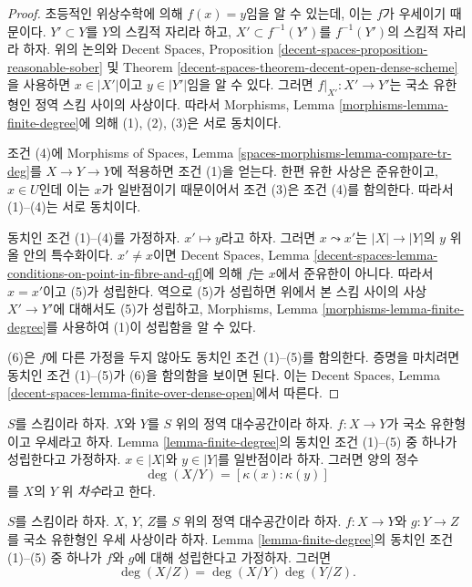 \begin{proof}
초등적인 위상수학에 의해 $f(x) = y$임을 알 수 있는데, 이는 $f$가
우세이기 때문이다. $Y' \subset Y$를 $Y$의 스킴적 자리라 하고,
$X' \subset f^{-1}(Y')$를 $f^{-1}(Y')$의 스킴적 자리라 하자. 위의
논의와 Decent Spaces, Proposition
\ref{decent-spaces-proposition-reasonable-sober} 및 Theorem
\ref{decent-spaces-theorem-decent-open-dense-scheme}을 사용하면
$x \in |X'|$이고 $y \in |Y'|$임을 알 수 있다. 그러면
$f|_{X'} : X' \to Y'$는 국소 유한형인 정역 스킴 사이의 사상이다.
따라서 Morphisms, Lemma \ref{morphisms-lemma-finite-degree}에 의해
(1), (2), (3)은 서로 동치이다.

\medskip\noindent
조건 (4)에 Morphisms of Spaces, Lemma
\ref{spaces-morphisms-lemma-compare-tr-deg}를 $X \to Y \to Y$에 적용하면
조건 (1)을 얻는다. 한편 유한 사상은 준유한이고, $x \in U$인데 이는
$x$가 일반점이기 때문이어서 조건 (3)은 조건 (4)를 함의한다. 따라서 (1)--(4)는
서로 동치이다.

\medskip\noindent
동치인 조건 (1)--(4)를 가정하자. $x' \mapsto y$라고 하자. 그러면
$x \leadsto x'$는 $|X| \to |Y|$의 $y$ 위 올 안의 특수화이다.
$x' \not = x$이면 Decent Spaces, Lemma
\ref{decent-spaces-lemma-conditions-on-point-in-fibre-and-qf}에 의해
$f$는 $x$에서 준유한이 아니다. 따라서 $x = x'$이고 (5)가 성립한다.
역으로 (5)가 성립하면 위에서 본 스킴 사이의 사상 $X' \to Y'$에
대해서도 (5)가 성립하고, Morphisms, Lemma
\ref{morphisms-lemma-finite-degree}를 사용하여 (1)이 성립함을 알 수 있다.

\medskip\noindent
(6)은 $f$에 다른 가정을 두지 않아도 동치인 조건 (1)--(5)를
함의한다. 증명을 마치려면 동치인 조건 (1)--(5)가 (6)을 함의함을
보이면 된다. 이는 Decent Spaces, Lemma
\ref{decent-spaces-lemma-finite-over-dense-open}에서 따른다.
\end{proof}

\begin{definition}
\label{definition-degree}
$S$를 스킴이라 하자. $X$와 $Y$를 $S$ 위의 정역 대수공간이라 하자.
$f : X \to Y$가 국소 유한형이고 우세라고 하자. Lemma
\ref{lemma-finite-degree}의 동치인 조건 (1)--(5) 중 하나가 성립한다고
가정하자. $x \in |X|$와 $y \in |Y|$를 일반점이라 하자. 그러면 양의
정수
$$
\deg(X/Y) = [\kappa(x) : \kappa(y)]
$$
를 $X$의 $Y$ 위 {\it 차수}라고 한다.
\end{definition}

\begin{lemma}
\label{lemma-degree-composition}
$S$를 스킴이라 하자. $X$, $Y$, $Z$를 $S$ 위의 정역 대수공간이라
하자. $f : X \to Y$와 $g : Y \to Z$를 국소 유한형인 우세 사상이라
하자. Lemma \ref{lemma-finite-degree}의 동치인 조건 (1)--(5) 중 하나가
$f$와 $g$에 대해 성립한다고 가정하자. 그러면
$$
\deg(X/Z) = \deg(X/Y) \deg(Y/Z).
$$
\end{lemma}

